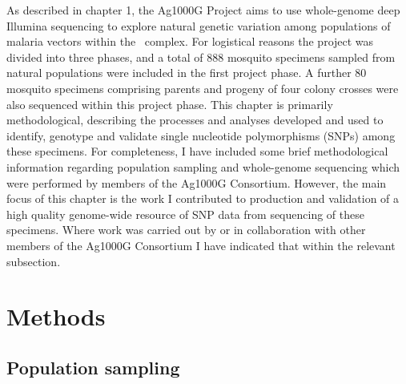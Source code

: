 \begin{refsection}
As described in chapter 1, the Ag1000G Project aims to use whole-genome deep Illumina sequencing to explore natural genetic variation among populations of malaria vectors within the \agam\ complex.
%
For logistical reasons the project was divided into three phases, and a total of 888 mosquito specimens sampled from natural populations were included in the first project phase.
%
A further 80 mosquito specimens comprising parents and progeny of four colony crosses were also sequenced within this project phase.
%
This chapter is primarily methodological, describing the processes and analyses developed and used to identify, genotype and validate single nucleotide polymorphisms (SNPs) among these specimens.
%
For completeness, I have included some brief methodological information regarding population sampling and whole-genome sequencing which were performed by members of the Ag1000G Consortium.
%
However, the main focus of this chapter is the work I contributed to production and validation of a high quality genome-wide resource of SNP data from sequencing of these specimens.
%
Where work was carried out by or in collaboration with other members of the Ag1000G Consortium I have indicated that within the relevant subsection.



\section{Methods}\label{sec:ch3-methods}


\subsection{Population sampling}\label{subsec:population-sampling}



\end{refsection}
